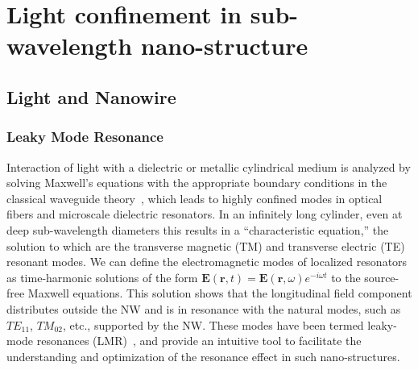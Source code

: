 \chapter{Light confinement in sub-wavelength nano-structure} \label{LM}


\section{Light and Nanowire} \label{LightNW}


\subsection{Leaky Mode Resonance}
\label{sec:LMR}

Interaction of light with a dielectric or metallic cylindrical medium is
analyzed by solving Maxwell's equations with the appropriate boundary
conditions in the classical waveguide theory~\cite{Kapany:tq}, which leads to
highly confined modes in optical fibers and microscale dielectric resonators.
In an infinitely long cylinder, even at deep sub-wavelength diameters this
results in a “characteristic equation,” the solution to which are the
transverse magnetic (TM) and transverse electric (TE) resonant modes. We can
define the electromagnetic modes of localized resonators as time-harmonic
solutions of the form $\bm{E}(\bm{r},t) = \bm{E}(\bm{r},\omega)e^{-i\omega{t}}$
to the source-free Maxwell equations. This solution shows that the longitudinal
field component distributes outside the NW and is in resonance with the
natural modes, such as ${TE}_{11}$, ${TM}_{02}$, etc., supported by the NW.
These modes have been termed leaky-mode resonances
(LMR)~\cite{Cao:2009ho,Fountaine:2014de}, and provide an intuitive tool to
facilitate the understanding and optimization of the resonance effect in such
nano-structures.

